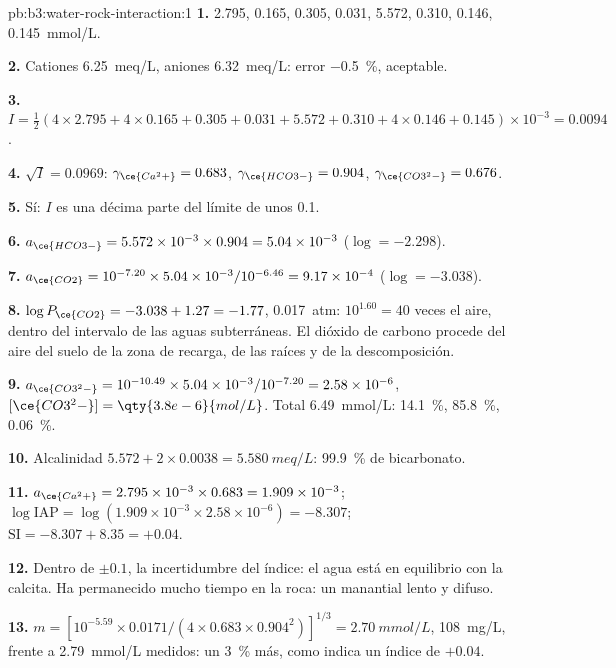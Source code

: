 \begin{solution}{pb:b3:water-rock-interaction:1}
\textbf{1.}  2.795,  0.165,  0.305,  0.031,
 5.572,  0.310,  0.146,  \qty{0.145}{mmol/L}.

\textbf{2.} Cationes \qty{6.25}{meq/L}, aniones \qty{6.32}{meq/L}: error
\qty{-0.5}{\percent}, aceptable.

\textbf{3.} $I = \tfrac12(4\times2.795 + 4\times0.165 + 0.305 + 0.031 + 5.572
+ 0.310 + 4\times0.146 + 0.145)\times10^{-3} = 0.0094$.

\textbf{4.} $\sqrt I = 0.0969$: $\gamma_{\ce{Ca^2+}} = 0.683$,
$\gamma_{\ce{HCO3-}} = 0.904$, $\gamma_{\ce{CO3^2-}} = 0.676$.

\textbf{5.} Sí: $I$ es una décima parte del límite de unos 0.1.

\textbf{6.} $a_{\ce{HCO3-}} = 5.572\times10^{-3}\times0.904 = 5.04\times
10^{-3}$ ($\log = -2.298$).

\textbf{7.} $a_{\ce{CO2}} = 10^{-7.20}\times5.04\times10^{-3}/10^{-6.46} =
9.17\times10^{-4}$ ($\log = -3.038$).

\textbf{8.} $\log P_{\ce{CO2}} = -3.038 + 1.27 = -1.77$, \qty{0.017}{atm}:
$10^{1.60} = 40$ veces el aire, dentro del intervalo de las aguas subterráneas. El
dióxido de carbono procede del aire del suelo de la zona de recarga, de las raíces y de la descomposición.

\textbf{9.} $a_{\ce{CO3^2-}} = 10^{-10.49}\times5.04\times10^{-3}/10^{-7.20}
= 2.58\times10^{-6}$, $[\ce{CO3^2-}] = \qty{3.8e-6}{mol/L}$. Total
\qty{6.49}{mmol/L}:  \qty{14.1}{\percent}, 
\qty{85.8}{\percent},  \qty{0.06}{\percent}.

\textbf{10.} Alcalinidad $5.572 + 2\times0.0038 = \qty{5.580}{meq/L}$:
\qty{99.9}{\percent} de bicarbonato.

\textbf{11.} $a_{\ce{Ca^2+}} = 2.795\times10^{-3}\times0.683 = 1.909\times
10^{-3}$; $\log\mathrm{IAP} = \log(1.909\times10^{-3}\times2.58\times10^{-6})
= -8.307$; $\mathrm{SI} = -8.307 + 8.35 = +0.04$.

\textbf{12.} Dentro de $\pm0.1$, la incertidumbre del índice: el agua está en
equilibrio con la calcita. Ha permanecido mucho tiempo en la roca: un
manantial lento y difuso.

\textbf{13.} $m = [10^{-5.59}\times0.0171/(4\times0.683\times0.904^2)]^{1/3}
= \qty{2.70}{mmol/L}$, \qty{108}{mg/L}, frente a \qty{2.79}{mmol/L} medidos:
un \qty{3}{\percent} más, como indica un índice de $+0.04$.


\end{solution}

